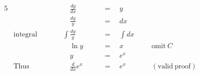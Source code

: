 \begin{alignat*}{5}
&\,&&\quad\frac{dy}{dx}\quad&&\,=\quad y\\
&\,&&\quad\frac{dy}{y}\quad&&\,=\quad dx\\
&\mathrm{integral}\qquad&&\int\frac{dy}{y}\quad&&\,=\quad \int{dx}\\
&\,&&\quad\ln{y}\quad&&\,=\quad x\qquad&&\mathrm{omit}~C\\
&\,&&\quad y\quad&&\,=\quad e^x\\
&\mathrm{Thus}&&\quad\frac{d}{dx}e^x\quad&&\,=\quad e^x\qquad&&\mathrm{(valid~proof)}
\end{alignat*}
